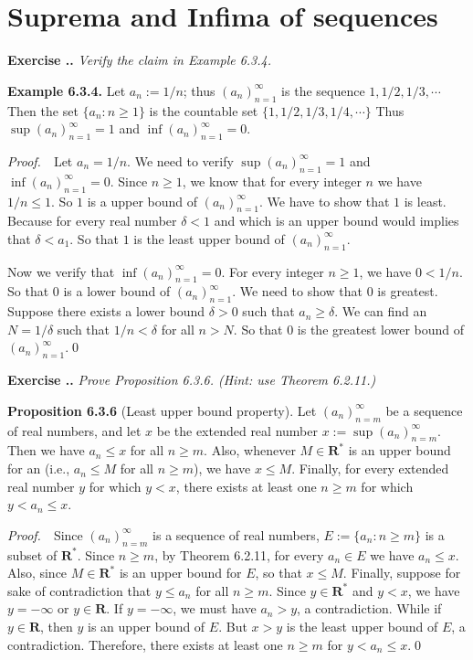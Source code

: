 \documentclass{book}
\newcommand{\pff}{\vspace{.25em}\noindent\emph{Proof.}~~}
\newcommand{\titl}[1]{\noindent\textbf{#1}}
\newcounter{Exercise}[section]
\renewcommand{\theExercise}{\thesection.\arabic{Exercise}.}
\newcommand{\new}{\vspace{1.5em}\noindent\textbf{{Exercise \stepcounter{Exercise}\textbf{\theExercise}}} }
\begin{document}
\section{Suprema and Infima of sequences}

\new\emph{Verify the claim in Example 6.3.4.}

\begin{framed}
\titl{Example 6.3.4.} Let $a_n:=1/n$; thus $(a_n)_{n=1}^{\infty}$ is the sequence $1,1/2,1/3,\cdots$ Then the set $\{a_n:n\geq 1\}$ is the countable set $\{1,1/2,1/3,1/4,\cdots\}$ Thus $\sup(a_n)_{n=1}^{\infty}=1$ and $\inf(a_n)_{n=1}^{\infty}=0$.
\end{framed}

\pff Let $a_n=1/n$. We need to verify $\sup(a_n)_{n=1}^\infty=1$ and $\inf(a_n)_{n=1}^\infty=0$. Since $n\geq 1$, we know that for every integer $n$ we have $1/n\leq 1$. So $1$ is a upper bound of $(a_n)_{n=1}^\infty$. We have to show that $1$ is least. Because for every real number $\delta<1$ and which is an upper bound would implies that $\delta<a_1$. So that $1$ is the least upper bound of $(a_n)_{n=1}^\infty$.

Now we verify that $\inf(a_n)_{n=1}^\infty=0$. For every integer $n\geq 1$, we have $0<1/n$. So that $0$ is a lower bound of $(a_n)_{n=1}^\infty$. We need to show that $0$ is greatest. Suppose there exists a lower bound $\delta>0$ such that $a_n\geq\delta$. We can find an $N=1/\delta$ such that $1/n<\delta$ for all $n>N$. So that $0$ is the greatest lower bound of $(a_n)_{n=1}^\infty$.\qed

\new\emph{Prove Proposition 6.3.6. (Hint: use Theorem 6.2.11.)}

\begin{framed}
\titl{Proposition 6.3.6} (Least upper bound property). Let $(a_n)_{n=m}^{\infty}$ be a sequence of real numbers, and let $x$ be the extended real number $x:=\sup(a_n)_{n=m}^{\infty}$. Then we have $a_n\leq x$ for all $n\geq m$. Also, whenever $M\in\mathbf{R}^*$ is an upper bound for an (i.e., $a_n\leq M$ for all $n\geq m$), we have $x\leq M$. Finally, for every extended real number $y$ for which $y<x$, there exists at least one $n\geq m$ for which $y<a_n\leq x$.
\end{framed}

\pff Since $(a_n)_{n=m}^\infty$ is a sequence of real numbers, $E:=\{a_n:n\geq m\}$ is a subset of $\mathbf{R^*}$. Since $n\geq m$, by Theorem 6.2.11, for every $a_n\in E$ we have $a_n\leq x$. Also, since $M\in\mathbf{R^*}$ is an upper bound for $E$, so that $x\leq M$. Finally, suppose for sake of contradiction that $y\leq a_n$ for all $n\geq m$. Since $y\in\mathbf{R^*}$ and $y<x$, we have $y=-\infty$ or $y\in\mathbf{R}$. If $y=-\infty$, we must have $a_n>y$, a contradiction. While if $y\in\mathbf{R}$, then $y$ is an upper bound of $E$. But $x>y$ is the least upper bound of $E$, a contradiction. Therefore, there exists at least one $n\geq m$ for $y<a_n\leq x$.\qed
\end{document}
